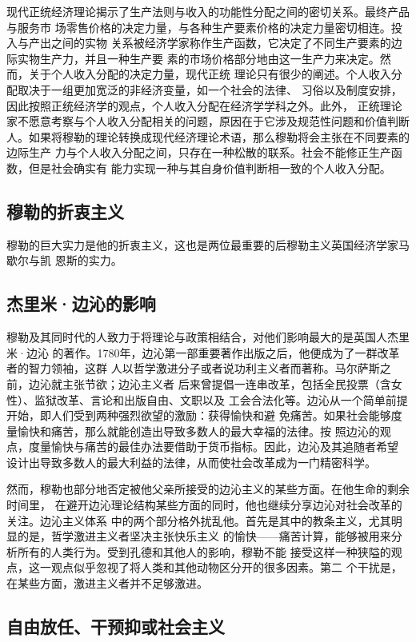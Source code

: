 现代正统经济理论揭示了生产法则与收入的功能性分配之间的密切关系。最终产品与服务市
场零售价格的决定力量，与各种生产要素价格的决定力量密切相连。投入与产出之间的实物
关系被经济学家称作生产函数，它决定了不同生产要素的边际实物生产力，并且一种生产要
素的市场价格部分地由这一生产力来决定。然而，关于个人收入分配的决定力量，现代正统
理论只有很少的阐述。个人收入分配取决于一组更加宽泛的非经济变量，如一个社会的法律、
习俗以及制度安排，因此按照正统经济学的观点，个人收入分配在经济学学科之外。此外，
正统理论家不愿意考察与个人收入分配相关的问题，原因在于它涉及规范性问题和价值判断
人。如果将穆勒的理论转换成现代经济理论术语，那么穆勒将会主张在不同要素的边际生产
力与个人收入分配之间，只存在一种松散的联系。社会不能修正生产函数，但是社会确实有
能力实现一种与其自身价值判断相一致的个人收入分配。

\subsection{穆勒的折衷主义}

穆勒的巨大实力是他的折衷主义，这也是两位最重要的后穆勒主义英国经济学家马歇尔与凯
恩斯的实力。

\subsection{杰里米·边沁的影响}

穆勒及其同时代的人致力于将理论与政策相结合，对他们影响最大的是英国人杰里米·边沁
的著作。1780年，边沁第一部重要著作出版之后，他便成为了一群改革者的智力领袖，这群
人以哲学激进分子或者说功利主义者而著称。马尔萨斯之前，边沁就主张节欲；边沁主义者
后来曾提倡一连串改革，包括全民投票（含女性）、监狱改革、言论和出版自由、文职以及
工会合法化等。边沁从一个简单前提开始，即人们受到两种强烈欲望的激励：获得愉快和避
免痛苦。如果社会能够度量愉快和痛苦，那么就能创造出导致多数人的最大幸福的法律。按
照边沁的观点，度量愉快与痛苦的最佳办法要借助于货币指标。因此，边沁及其追随者希望
设计出导致多数人的最大利益的法律，从而使社会改革成为一门精密科学。

然而，穆勒也部分地否定被他父亲所接受的边沁主义的某些方面。在他生命的剩余时间里，
在避开边沁理论结构某些方面的同时，他也继续分享边沁对社会改革的关注。边沁主义体系
中的两个部分格外扰乱他。首先是其中的教条主义，尤其明显的是，哲学激进主义者坚决主张快乐主义
的愉快——痛苦计算，能够被用来分析所有的人类行为。受到孔德和其他人的影响，穆勒不能
接受这样一种狭隘的观点，这一观点似乎忽视了将人类和其他动物区分开的很多因素。第二
个干扰是，在某些方面，激进主义者并不足够激进。

\subsection{自由放任、干预抑或社会主义}

